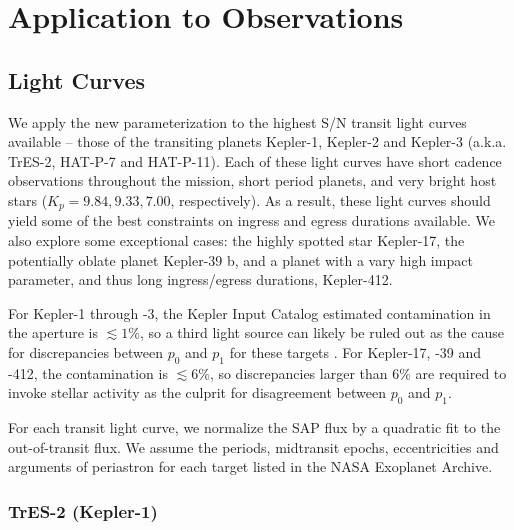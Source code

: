 \section{Application to Observations} \label{sec:app}
\subsection{\kepler Light Curves} \label{sec:kepler}

We apply the new parameterization to the highest S/N transit light curves available -- those of the transiting planets Kepler-1, Kepler-2 and Kepler-3 (a.k.a. TrES-2, HAT-P-7 and HAT-P-11). Each of these light curves have short cadence observations throughout the \kepler mission, short period planets, and very bright host stars ($K_p=9.84, 9.33, 7.00$, respectively). As a result, these light curves should yield some of the best constraints on ingress and egress durations available. We also explore some exceptional cases: the highly spotted star Kepler-17, the potentially oblate planet Kepler-39 b, and a planet with a vary high impact parameter, and thus long ingress/egress durations, Kepler-412.

For Kepler-1 through -3, the Kepler Input Catalog estimated contamination in the \kepler aperture is $\lesssim 1\%$, so a third light source can likely be ruled out as the cause for discrepancies between $p_0$ and $p_1$ for these targets \citep{Brown2011}. For Kepler-17, -39 and -412, the contamination is $\lesssim 6\%$, so discrepancies larger than $6\%$ are required to invoke stellar activity as the culprit for disagreement between $p_0$ and $p_1$.

For each \kepler transit light curve, we normalize the SAP flux by a quadratic fit to the out-of-transit flux. We assume the periods, midtransit epochs, eccentricities and arguments of periastron for each target listed in the NASA Exoplanet Archive. 

\subsubsection{TrES-2 (Kepler-1)}

